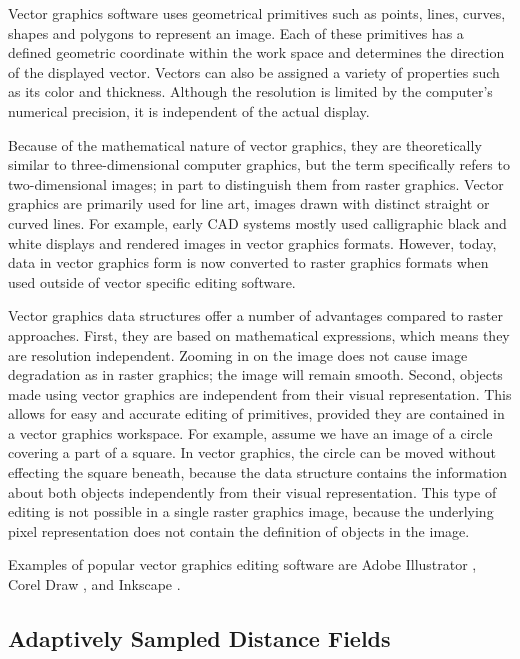 Vector graphics software uses geometrical primitives such as points, lines, curves, shapes and polygons to represent an image.
Each of these primitives has a defined geometric coordinate within the work space and determines the direction of the displayed vector. 
Vectors can also be assigned a variety of properties such as its color and thickness.
Although the resolution is limited by the computer's numerical precision, it is independent of the actual display. 

Because of the mathematical nature of vector graphics, they are theoretically similar to three-dimensional computer graphics, but the term specifically refers to two-dimensional images; in part to distinguish them from raster graphics.
Vector graphics are primarily used for line art, images drawn with distinct straight or curved lines.
For example, early CAD systems mostly used calligraphic black and white displays and rendered images in vector graphics formats. 
However, today, data in vector graphics form is now converted to raster graphics formats when used outside of vector specific editing software.  

Vector graphics data structures offer a number of advantages compared to raster approaches. 
First, they are based on mathematical expressions, which means they are resolution independent.
Zooming in on the image does not cause image degradation as in raster graphics; the image will remain smooth. 
Second, objects made using vector graphics are independent from their visual representation.
This allows for easy and accurate editing of primitives, provided they are contained in a vector graphics workspace.
For example, assume we have an image of a circle covering a part of a square. In vector graphics, the circle can be moved without effecting the square beneath, because the data structure contains the information about both objects independently from their visual representation.
This type of editing is not possible in a single raster graphics image, because the underlying pixel representation does not contain the definition of objects in the image.

Examples of popular vector graphics editing software are Adobe Illustrator \autocite{illustrator}, Corel Draw \autocite{coreldraw}, and Inkscape \autocite{inkscape}.

\subsection{Adaptively Sampled Distance Fields}

